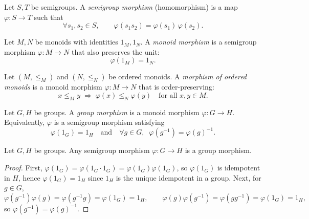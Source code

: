 
\begin{definition}
\label{def:semigroup-morphism}
Let \(S,T\) be semigroups. A \emph{semigroup morphism} (homomorphism) is a map \(\varphi:S\to T\) such that
\[
\forall s_1,s_2\in S,\qquad \varphi(s_1 s_2)=\varphi(s_1)\,\varphi(s_2).
\]
\end{definition}

\begin{definition}
\label{def:monoid-morphism}
Let \(M,N\) be monoids with identities \(1_M,1_N\). A \emph{monoid morphism} is a semigroup morphism \(\varphi:M\to N\) that also preserves the unit:
\[
\varphi(1_M)=1_N.
\]
\end{definition}

\begin{definition}
\label{def:ordered-monoid-morphism}
Let \((M,\le_M)\) and \((N,\le_N)\) be ordered monoids. A \emph{morphism of ordered monoids} is a monoid morphism \(\varphi:M\to N\) that is order-preserving:
\[
x\le_M y \;\Longrightarrow\; \varphi(x)\le_N \varphi(y)\quad\text{for all }x,y\in M.
\]
\end{definition}

\begin{definition}
\label{def:group-morphism}
Let \(G,H\) be groups. A \emph{group morphism} is a monoid morphism \(\varphi:G\to H\). Equivalently, \(\varphi\) is a semigroup morphism satisfying
\[
\varphi(1_G)=1_H\quad\text{and}\quad \forall g\in G,\;\; \varphi(g^{-1})=\varphi(g)^{-1}.
\]
\end{definition}

\begin{lemma}
\label{lem:sgp-mor-between-groups-are-group-mor}
Let \(G,H\) be groups. Any semigroup morphism \(\varphi:G\to H\) is a group morphism.
\end{lemma}
\begin{proof}
First, \(\varphi(1_G)=\varphi(1_G\cdot 1_G)=\varphi(1_G)\varphi(1_G)\), so \(\varphi(1_G)\) is idempotent in \(H\), hence \(\varphi(1_G)=1_H\) since \(1_H\) is the unique idempotent in a group. Next, for \(g\in G\),
\[
\varphi(g^{-1})\varphi(g)=\varphi(g^{-1}g)=\varphi(1_G)=1_H,\qquad
\varphi(g)\varphi(g^{-1})=\varphi(gg^{-1})=\varphi(1_G)=1_H,
\]
so \(\varphi(g^{-1})=\varphi(g)^{-1}\).
\end{proof}

